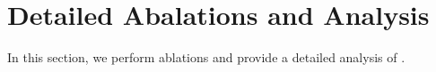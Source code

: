 \section{\name Detailed Abalations and Analysis}
\label{sec:experiments_analysis}
In this section, we perform ablations and provide a detailed analysis of \name.




